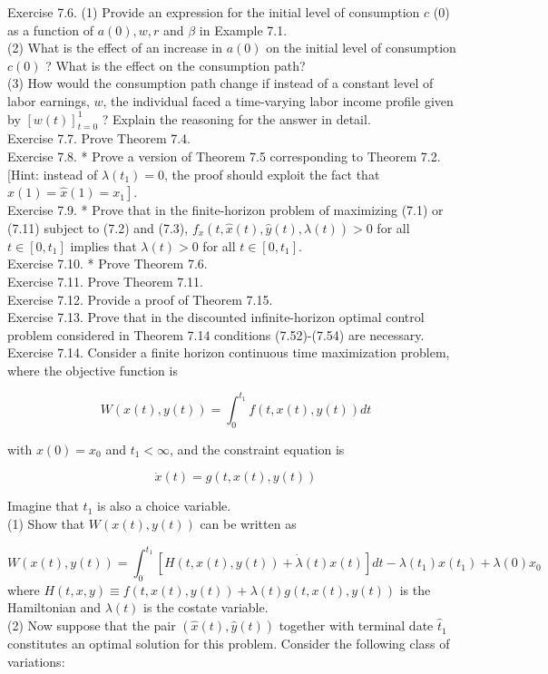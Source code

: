 \documentclass[\topdir/lecture_notes.tex]{subfiles}
\begin{document}
Exercise 7.6. (1) Provide an expression for the initial level of consumption $c$ (0) as a function of $a(0), w, r$ and $\beta$ in Example 7.1.\\
(2) What is the effect of an increase in $a(0)$ on the initial level of consumption $c(0)$ ? What is the effect on the consumption path?\\
(3) How would the consumption path change if instead of a constant level of labor earnings, $w$, the individual faced a time-varying labor income profile given by $[w(t)]_{t=0}^{1}$ ? Explain the reasoning for the answer in detail.\\
Exercise 7.7. Prove Theorem 7.4.\\
Exercise 7.8. * Prove a version of Theorem 7.5 corresponding to Theorem 7.2. [Hint: instead of $\lambda\left(t_{1}\right)=0$, the proof should exploit the fact that $\left.x(1)=\hat{x}(1)=x_{1}\right]$.\\
Exercise 7.9. * Prove that in the finite-horizon problem of maximizing (7.1) or (7.11) subject to (7.2) and (7.3), $f_{x}(t, \hat{x}(t), \hat{y}(t), \lambda(t))>0$ for all $t \in\left[0, t_{1}\right]$ implies that $\lambda(t)>0$ for all $t \in\left[0, t_{1}\right]$.\\
Exercise 7.10. * Prove Theorem 7.6.\\
Exercise 7.11. Prove Theorem 7.11.\\
Exercise 7.12. Provide a proof of Theorem 7.15.\\
Exercise 7.13. Prove that in the discounted infinite-horizon optimal control problem considered in Theorem 7.14 conditions (7.52)-(7.54) are necessary.\\
Exercise 7.14. Consider a finite horizon continuous time maximization problem, where the objective function is

\[
W(x(t), y(t))=\int_{0}^{t_{1}} f(t, x(t), y(t)) d t
\]

with $x(0)=x_{0}$ and $t_1<\infty$, and the constraint equation is

\[
\dot{x}(t)=g(t, x(t), y(t))
\]

Imagine that $t_1$ is also a choice variable.\\
(1) Show that $W(x(t), y(t))$ can be written as

\[
W(x(t), y(t))=\int_{0}^{t_{1}}[H(t, x(t), y(t))+\dot{\lambda}(t) x(t)] d t-\lambda\left(t_{1}\right) x\left(t_{1}\right)+\lambda(0) x_{0}
\]
where $H(t, x, y) \equiv f(t, x(t), y(t))+\lambda(t) g(t, x(t), y(t))$ is the Hamiltonian and $\lambda(t)$ is the costate variable.\\
(2) Now suppose that the pair $(\hat{x}(t), \hat{y}(t))$ together with terminal date $\hat{t}_{1}$ constitutes an optimal solution for this problem. Consider the following class of variations:
\end{document}
